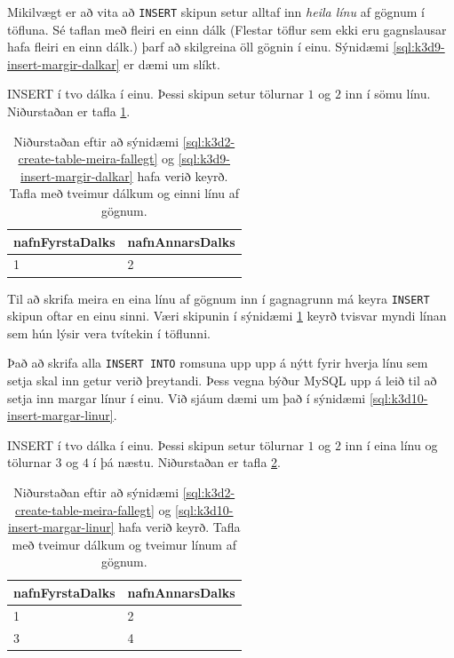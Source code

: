 Mikilvægt er að vita að \verb|INSERT| skipun setur alltaf inn \emph{heila línu} af gögnum í töfluna. Sé taflan með fleiri en einn dálk (Flestar töflur sem ekki eru gagnslausar hafa fleiri en einn dálk.) þarf að skilgreina öll gögnin í einu. Sýnidæmi \ref{sql:k3d9-insert-margir-dalkar} er dæmi um slíkt.

\begin{example}
\caption[INSERT í tvo dálka í einu]{INSERT í tvo dálka í einu. Þessi skipun setur tölurnar $1$ og $2$ inn í sömu línu. Niðurstaðan er tafla \ref{tafla:insert-margir-dalkar}.}
\label{sql:k3d9-insert-margir-dalkar}
\centering
{}
\end{example}

\begin{table}
\centering
\caption[Eftir INSERT á línu]{Niðurstaðan eftir að sýnidæmi \ref{sql:k3d2-create-table-meira-fallegt} og \ref{sql:k3d9-insert-margir-dalkar} hafa verið keyrð. Tafla með tveimur dálkum og einni línu af gögnum.}
\label{tafla:insert-margir-dalkar}
\begin{tabular}{ll}
\toprule
nafnFyrstaDalks&nafnAnnarsDalks\\
\midrule
1&2\\
\bottomrule
\end{tabular}
\end{table}
Til að skrifa meira en eina línu af gögnum inn í gagnagrunn má keyra \verb|INSERT| skipun oftar en einu sinni. Væri skipunin í sýnidæmi \ref{tafla:insert-margir-dalkar} keyrð tvisvar myndi línan sem hún lýsir vera tvítekin í töflunni.

Það að skrifa alla \verb|INSERT INTO| romsuna upp upp á nýtt fyrir hverja línu sem setja skal inn getur verið þreytandi. Þess vegna býður MySQL upp á leið til að setja inn margar línur í einu. Við sjáum dæmi um það í sýnidæmi \ref{sql:k3d10-insert-margar-linur}.

\begin{example}
\caption[INSERT í tvo dálka í einu]{INSERT í tvo dálka í einu. Þessi skipun setur tölurnar $1$ og $2$ inn í eina línu og tölurnar $3$ og $4$ í þá næstu. Niðurstaðan er tafla \ref{tafla:insert-margar-linur}.}
\label{sql:k3d10-insert-margar-linur}
\centering
{}
\end{example}

\begin{table}
\centering
\caption[Eftir INSERT á tveimur línum]{Niðurstaðan eftir að sýnidæmi \ref{sql:k3d2-create-table-meira-fallegt} og \ref{sql:k3d10-insert-margar-linur} hafa verið keyrð. Tafla með tveimur dálkum og tveimur línum af gögnum.}
\label{tafla:insert-margar-linur}
\begin{tabular}{ll}
\toprule
nafnFyrstaDalks&nafnAnnarsDalks\\
\midrule
1&2\\
3&4\\
\bottomrule
\end{tabular}
\end{table}

